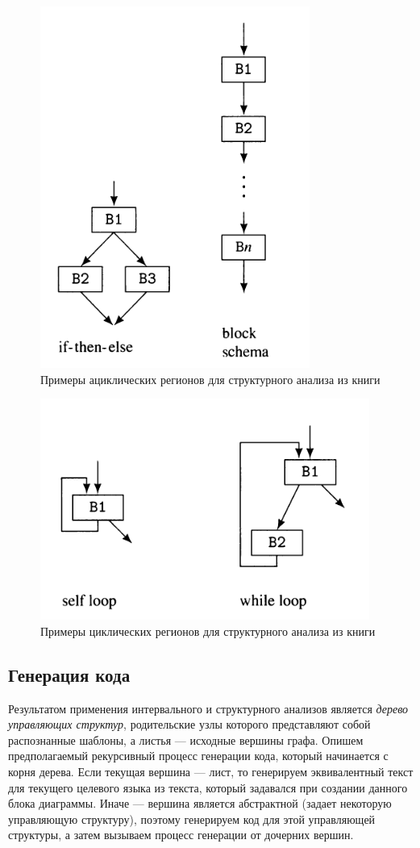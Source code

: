 \documentclass[14pt]{matmex-diploma}
\begin{document}
\begin{figure}[H]
\centering
\includegraphics[scale=0.6]{images/acyclic3.png}
\caption{Примеры ациклических регионов для структурного анализа из книги \cite{muchnick1997advanced}}
\label{acyclic3}
\end{figure}


\begin{figure}[H]
\centering
\includegraphics[scale=0.6]{images/cyclic2.png}
\caption{Примеры циклических регионов для структурного анализа из книги \cite{muchnick1997advanced}}
\label{cyclic}
\end{figure}

\subsection{Генерация кода}
Результатом применения интервального и структурного анализов является \emph{дерево управляющих структур}, 
родительские узлы которого представляют собой распознанные шаблоны, а листья --- 
исходные вершины графа. Опишем предполагаемый 
рекурсивный процесс генерации кода, который начинается с корня дерева.
Если текущая вершина --- лист, то генерируем эквивалентный текст для текущего 
целевого языка из текста, 
который задавался при создании данного блока диаграммы. 
Иначе --- вершина является абстрактной (задает некоторую управляющую структуру),
поэтому генерируем код для 
этой управляющей структуры, а затем вызываем процесс генерации от дочерних вершин.
\end{document}
